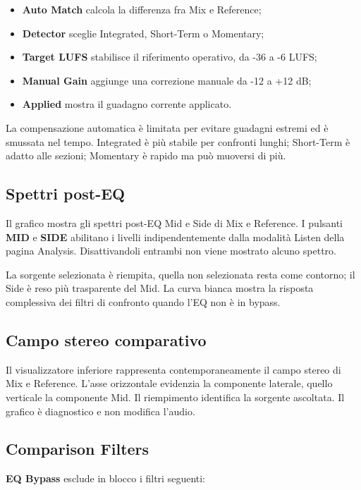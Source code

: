 \documentclass[11pt,a4paper]{article}
\newcommand{\control}[1]{\textbf{\textsf{#1}}}
\begin{document}
\begin{itemize}
  \item \control{Auto Match} calcola la differenza fra Mix e Reference;
  \item \control{Detector} sceglie Integrated, Short-Term o Momentary;
  \item \control{Target LUFS} stabilisce il riferimento operativo, da -36 a
  -6 LUFS;
  \item \control{Manual Gain} aggiunge una correzione manuale da -12 a
  +12 dB;
  \item \control{Applied} mostra il guadagno corrente applicato.
\end{itemize}

La compensazione automatica è limitata per evitare guadagni estremi ed è
smussata nel tempo. Integrated è più stabile per confronti lunghi; Short-Term
è adatto alle sezioni; Momentary è rapido ma può muoversi di più.

\subsection{Spettri post-EQ}

Il grafico mostra gli spettri post-EQ Mid e Side di Mix e Reference. I pulsanti
\control{MID} e \control{SIDE} abilitano i livelli indipendentemente dalla
modalità Listen della pagina Analysis. Disattivandoli entrambi non viene
mostrato alcuno spettro.

La sorgente selezionata è riempita, quella non selezionata resta come contorno;
il Side è reso più trasparente del Mid. La curva bianca mostra la risposta
complessiva dei filtri di confronto quando l'EQ non è in bypass.

\subsection{Campo stereo comparativo}

Il visualizzatore inferiore rappresenta contemporaneamente il campo stereo di
Mix e Reference. L'asse orizzontale evidenzia la componente laterale, quello
verticale la componente Mid. Il riempimento identifica la sorgente ascoltata.
Il grafico è diagnostico e non modifica l'audio.

\subsection{Comparison Filters}

\control{EQ Bypass} esclude in blocco i filtri seguenti:
\end{document}
